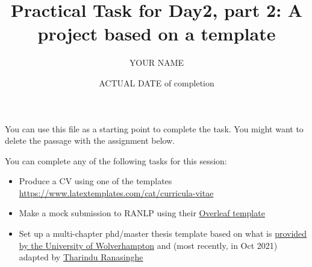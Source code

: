 \documentclass[a4paper,11pt]{article}
\title{Practical Task for Day2, part 2: A project based on a template}
\author{YOUR NAME}
\date{ACTUAL DATE of completion}
\begin{document}
	
	\maketitle


\bigskip

You can use this file as a starting point to complete the task. You might want to delete the passage with the assignment below.

\bigskip

You can complete any of the following tasks for this session:

	\begin{itemize}
		\item Produce a CV using one of the templates \href{here}{https://www.latextemplates.com/cat/curricula-vitae}
		\item Make a mock submission to RANLP using their \href{https://www.overleaf.com/latex/templates/instructions-for-ranlp-2021-proceedings/snyphxfdqcpz}{Overleaf template}
		\item Set up a multi-chapter phd/master thesis template based on what is \href{https://github.com/snim2/phdtemplate}{provided by the University of Wolverhampton} and (most recently, in Oct 2021) adapted by \href{https://github.com/TharinduDR/Thesis/}{Tharindu Ranasinghe}
	\end{itemize}
	
\end{document}
